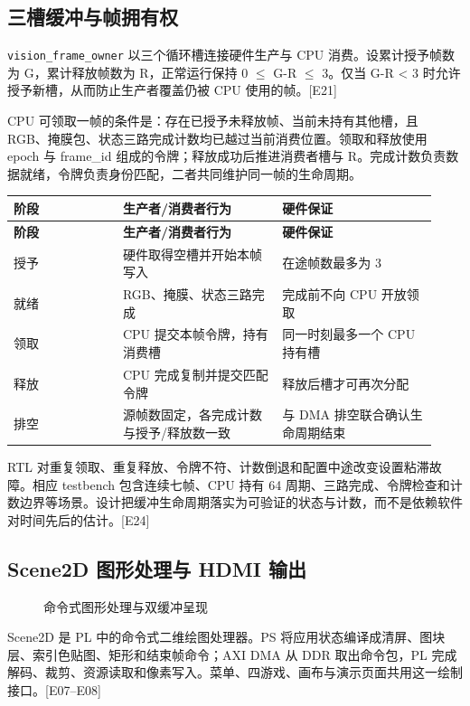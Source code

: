 \subsection{三槽缓冲与帧拥有权}
\nolinkurl{vision_frame_owner} 以三个循环槽连接硬件生产与 CPU 消费。设累计授予帧数为 G，累计释放帧数为 R，正常运行保持 0 $\leq$ G-R $\leq$ 3。仅当 G-R < 3 时允许授予新槽，从而防止生产者覆盖仍被 CPU 使用的帧。[E21]

CPU 可领取一帧的条件是：存在已授予未释放帧、当前未持有其他槽，且 RGB、掩膜包、状态三路完成计数均已越过当前消费位置。领取和释放使用 epoch 与 frame\_id 组成的令牌；释放成功后推进消费者槽与 R。完成计数负责数据就绪，令牌负责身份匹配，二者共同维护同一帧的生命周期。

{\small\renewcommand{\arraystretch}{1.28}
\begin{longtable}{@{}>{\raggedright\arraybackslash}p{0.24\linewidth}>{\raggedright\arraybackslash}p{0.35\linewidth}>{\raggedright\arraybackslash}p{0.34\linewidth}@{}}
\toprule
\bfseries 阶段 & \bfseries 生产者/消费者行为 & \bfseries 硬件保证\\\midrule
\endfirsthead
\toprule
\bfseries 阶段 & \bfseries 生产者/消费者行为 & \bfseries 硬件保证\\\midrule
\endhead
\bottomrule\endfoot
授予 & 硬件取得空槽并开始本帧写入 & 在途帧数最多为 3\\
就绪 & RGB、掩膜、状态三路完成 & 完成前不向 CPU 开放领取\\
领取 & CPU 提交本帧令牌，持有消费槽 & 同一时刻最多一个 CPU 持有槽\\
释放 & CPU 完成复制并提交匹配令牌 & 释放后槽才可再次分配\\
排空 & 源帧数固定，各完成计数与授予/释放数一致 & 与 DMA 排空联合确认生命周期结束\\
\end{longtable}}
RTL 对重复领取、重复释放、令牌不符、计数倒退和配置中途改变设置粘滞故障。相应 testbench 包含连续七帧、CPU 持有 64 周期、三路完成、令牌检查和计数边界等场景。设计把缓冲生命周期落实为可验证的状态与计数，而不是依赖软件对时间先后的估计。[E24]

\subsection{Scene2D 图形处理与 HDMI 输出}
\begin{figure}[htbp]\centering\caption{命令式图形处理与双缓冲呈现}\label{fig:4}\end{figure}
Scene2D 是 PL 中的命令式二维绘图处理器。PS 将应用状态编译成清屏、图块层、索引色贴图、矩形和结束帧命令；AXI DMA 从 DDR 取出命令包，PL 完成解码、裁剪、资源读取和像素写入。菜单、四游戏、画布与演示页面共用这一绘制接口。[E07–E08]

